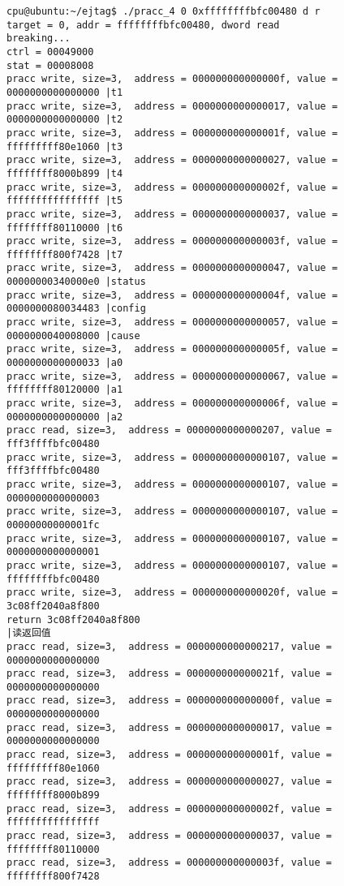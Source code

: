 \begin{verbatim}
cpu@ubuntu:~/ejtag$ ./pracc_4 0 0xffffffffbfc00480 d r
target = 0, addr = ffffffffbfc00480, dword read
breaking...
ctrl = 00049000
stat = 00008008
pracc write, size=3,  address = 000000000000000f, value = 0000000000000000 |t1
pracc write, size=3,  address = 0000000000000017, value = 0000000000000000 |t2
pracc write, size=3,  address = 000000000000001f, value = fffffffff80e1060 |t3
pracc write, size=3,  address = 0000000000000027, value = ffffffff8000b899 |t4
pracc write, size=3,  address = 000000000000002f, value = ffffffffffffffff |t5
pracc write, size=3,  address = 0000000000000037, value = ffffffff80110000 |t6
pracc write, size=3,  address = 000000000000003f, value = ffffffff800f7428 |t7
pracc write, size=3,  address = 0000000000000047, value = 00000000340000e0 |status
pracc write, size=3,  address = 000000000000004f, value = 0000000080034483 |config
pracc write, size=3,  address = 0000000000000057, value = 0000000040008000 |cause
pracc write, size=3,  address = 000000000000005f, value = 0000000000000033 |a0
pracc write, size=3,  address = 0000000000000067, value = ffffffff80120000 |a1
pracc write, size=3,  address = 000000000000006f, value = 0000000000000000 |a2
pracc read, size=3,  address = 0000000000000207, value = fff3ffffbfc00480
pracc write, size=3,  address = 0000000000000107, value = fff3ffffbfc00480
pracc write, size=3,  address = 0000000000000107, value = 0000000000000003
pracc write, size=3,  address = 0000000000000107, value = 00000000000001fc
pracc write, size=3,  address = 0000000000000107, value = 0000000000000001
pracc write, size=3,  address = 0000000000000107, value = ffffffffbfc00480
pracc write, size=3,  address = 000000000000020f, value = 3c08ff2040a8f800
return 3c08ff2040a8f800                                                        |读返回值
pracc read, size=3,  address = 0000000000000217, value = 0000000000000000
pracc read, size=3,  address = 000000000000021f, value = 0000000000000000
pracc read, size=3,  address = 000000000000000f, value = 0000000000000000
pracc read, size=3,  address = 0000000000000017, value = 0000000000000000
pracc read, size=3,  address = 000000000000001f, value = fffffffff80e1060
pracc read, size=3,  address = 0000000000000027, value = ffffffff8000b899
pracc read, size=3,  address = 000000000000002f, value = ffffffffffffffff
pracc read, size=3,  address = 0000000000000037, value = ffffffff80110000
pracc read, size=3,  address = 000000000000003f, value = ffffffff800f7428
\end{verbatim}

